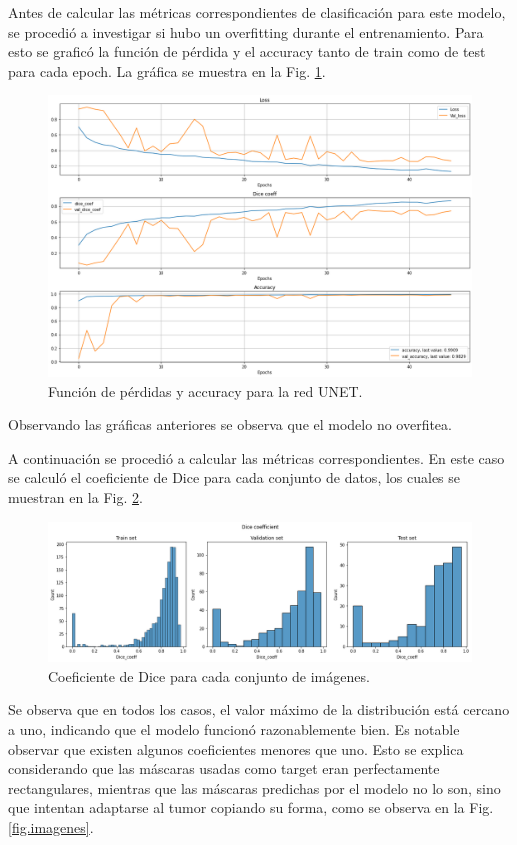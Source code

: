 Antes de calcular las métricas correspondientes de clasificación para este modelo, se procedió a investigar si hubo un overfitting durante el entrenamiento. Para esto se graficó la función de pérdida y el accuracy tanto de train como de test para cada epoch. La gráfica se muestra en la Fig. \ref{fig.loss}. 


\begin{figure}[H]
\centering
        \includegraphics[width=0.8\linewidth]{chapters/segmentacion/images/metricas.png}
        \caption{Función de pérdidas y accuracy para la red UNET.}
        \label{fig.loss}
  \end{figure}

Observando las gráficas anteriores se observa que el modelo no overfitea. 

A continuación se procedió a calcular las métricas correspondientes. En este caso se calculó el coeficiente de Dice para cada conjunto de datos, los cuales se muestran en la Fig. \ref{fig.dice}.


\begin{figure}[H]
\centering
        \includegraphics[width=0.9\linewidth]{chapters/segmentacion/images/dice.png}
        \caption{Coeficiente de Dice para cada conjunto de imágenes.}
        \label{fig.dice}
  \end{figure}

Se observa que en todos los casos, el valor máximo de la distribución está cercano a uno, indicando que el modelo funcionó razonablemente bien. Es notable observar que existen algunos coeficientes menores que uno. Esto se explica considerando que las máscaras usadas como target eran perfectamente rectangulares, mientras que las máscaras predichas por el modelo no lo son, sino que intentan adaptarse al tumor copiando su forma, como se observa en la Fig. \ref{fig.imagenes}. 

